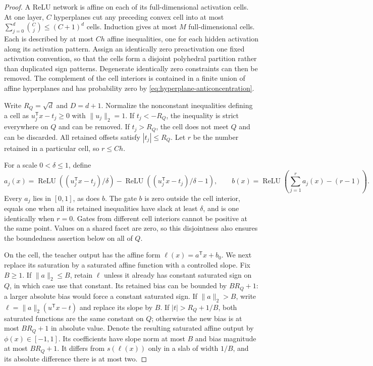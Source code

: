\begin{proof}
A ReLU network is affine on each of its full-dimensional activation cells. At one layer, $C$ hyperplanes cut any preceding convex cell into at most $\sum_{j=0}^d\binom Cj\le(C+1)^d$ cells. Induction gives at most $M$ full-dimensional cells. Each is described by at most $Ch$ affine inequalities, one for each hidden activation along its activation pattern. Assign an identically zero preactivation one fixed activation convention, so that the cells form a disjoint polyhedral partition rather than duplicated sign patterns. Degenerate identically zero constraints can then be removed. The complement of the cell interiors is contained in a finite union of affine hyperplanes and has probability zero by \eqref{eq:hyperplane-anticoncentration}.

Write $R_Q=\sqrt d$ and $D=d+1$. Normalize the nonconstant inequalities defining a cell as
$u_j^{\mathsf T}x-t_j\ge0$ with $\|u_j\|_2=1$. If $t_j<-R_Q$, the inequality is strict everywhere on $Q$ and can be removed. If $t_j>R_Q$, the cell does not meet $Q$ and can be discarded. All retained offsets satisfy $|t_j|\le R_Q$. Let $r$ be the number retained in a particular cell, so $r\le Ch$.

For a scale $0<\delta\le1$, define
\[
 a_j(x)=\operatorname{ReLU}((u_j^{\mathsf T}x-t_j)/\delta)
       -\operatorname{ReLU}((u_j^{\mathsf T}x-t_j)/\delta-1),
 \qquad
 b(x)=\operatorname{ReLU}\left(\sum_{j=1}^r a_j(x)-(r-1)\right).
\]
Every $a_j$ lies in $[0,1]$, as does $b$. The gate $b$ is zero outside the cell interior, equals one when all its retained inequalities have slack at least $\delta$, and is one identically when $r=0$. Gates from different cell interiors cannot be positive at the same point. Values on a shared facet are zero, so this disjointness also ensures the boundedness assertion below on all of $Q$.

On the cell, the teacher output has the affine form $\ell(x)=a^{\mathsf T}x+b_0$. We next replace its saturation by a saturated affine function with a controlled slope. Fix $B\ge1$. If $\|a\|_2\le B$, retain $\ell$ unless it already has constant saturated sign on $Q$, in which case use that constant. Its retained bias can be bounded by $BR_Q+1$: a larger absolute bias would force a constant saturated sign. If $\|a\|_2>B$, write $\ell=\|a\|_2(u^{\mathsf T}x-t)$ and replace its slope by $B$. If $|t|>R_Q+1/B$, both saturated functions are the same constant on $Q$; otherwise the new bias is at most $BR_Q+1$ in absolute value. Denote the resulting saturated affine output by $\phi(x)\in[-1,1]$. Its coefficients have slope norm at most $B$ and bias magnitude at most $BR_Q+1$. It differs from $s(\ell(x))$ only in a slab of width $1/B$, and its absolute difference there is at most two.


\end{proof}
